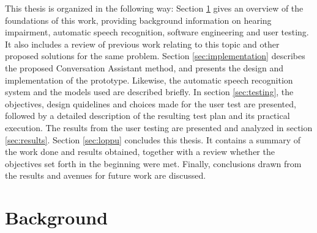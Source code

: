 \documentclass[english, 12pt, a4paper, pdftex, elec, utf8]{aaltothesis}
\begin{document}
This thesis is organized in the following way: Section \ref{sec:tausta} gives an overview of the foundations of this work, providing background information on hearing impairment, automatic speech recognition, software engineering and user testing. It also includes a review of previous work relating to this topic and other proposed solutions for the same problem. Section \ref{sec:implementation} describes the proposed Conversation Assistant method, and presents the design and implementation of the prototype. Likewise, the automatic speech recognition system and the models used are described briefly. In section \ref{sec:testing}, the objectives, design quidelines and choices made for the user test are presented, followed by a detailed description of the resulting test plan and its practical execution. The results from the user testing are presented and analyzed in section \ref{sec:results}. Section \ref{sec:loppu} concludes this thesis. It contains a summary of the work done and results obtained, together with a review whether the objectives set forth in the beginning were met. Finally, conclusions drawn from the results and avenues for future work are discussed.

\clearpage

\section{Background} \label{sec:tausta}
\end{document}
